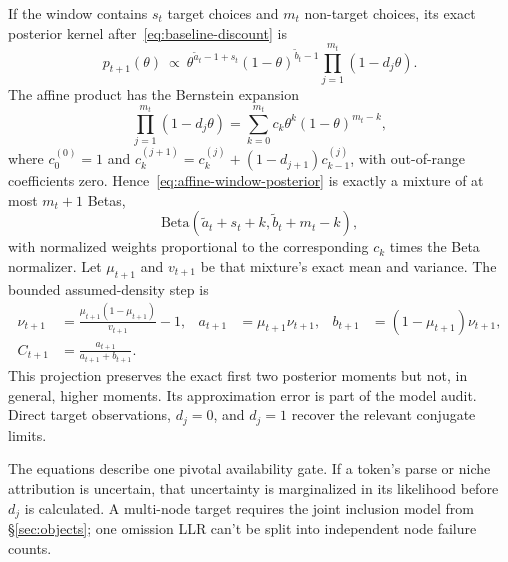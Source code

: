 If the window contains $s_t$ target choices and $m_t$ non-target choices, its
exact posterior kernel after~\eqref{eq:baseline-discount} is
\begin{equation}
p_{t+1}(\theta)\ \propto\
\theta^{\widetilde a_t-1+s_t}(1-\theta)^{\widetilde b_t-1}
\prod_{j=1}^{m_t}(1-d_j\theta).
\label{eq:affine-window-posterior}
\end{equation}
The affine product has the Bernstein expansion
\[
\prod_{j=1}^{m_t}(1-d_j\theta)=
\sum_{k=0}^{m_t}c_k\theta^k(1-\theta)^{m_t-k},
\]
where $c^{(0)}_0=1$ and
$c^{(j+1)}_k=c^{(j)}_k+(1-d_{j+1})c^{(j)}_{k-1}$, with out-of-range
coefficients zero. Hence~\eqref{eq:affine-window-posterior} is exactly a mixture
of at most $m_t+1$ Betas,
\[
\mathrm{Beta}(\widetilde a_t+s_t+k,
              \widetilde b_t+m_t-k),
\]
with normalized weights proportional to the corresponding $c_k$ times the
Beta normalizer. Let $\mu_{t+1}$ and $v_{t+1}$ be that mixture's exact mean and
variance. The bounded assumed-density step is
\begin{align}
\nu_{t+1}&=\frac{\mu_{t+1}(1-\mu_{t+1})}{v_{t+1}}-1, &
a_{t+1}&=\mu_{t+1}\nu_{t+1}, &
b_{t+1}&=(1-\mu_{t+1})\nu_{t+1},\\
C_{t+1}&=\frac{a_{t+1}}{a_{t+1}+b_{t+1}}.
\label{eq:beta-update}
\end{align}
This projection preserves the exact first two posterior moments but not, in
general, higher moments. Its approximation error is part of the model
audit. Direct target observations, $d_j=0$, and $d_j=1$ recover the relevant
conjugate limits.

The equations describe one pivotal availability gate. If a token's parse or
niche attribution is uncertain, that uncertainty is marginalized in its
likelihood before $d_j$ is calculated. A multi-node target requires
the joint inclusion model from \S\ref{sec:objects}; one omission LLR can't be
split into independent node failure counts.


